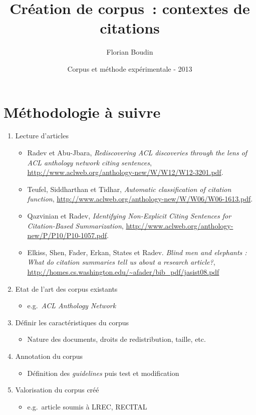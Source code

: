 \documentclass[12pt,a4paper]{article}
\begin{document}
\title{Création de corpus~: contextes de citations}
\author{Florian Boudin}
\date{Corpus et méthode expérimentale - 2013}

\maketitle

\section*{Méthodologie à suivre}

\begin{enumerate}
    \item Lecture d'articles
    \begin{itemize}
        \item Radev et Abu-Jbara, \textit{Rediscovering ACL discoveries through the lens of ACL anthology network citing sentences}, \url{http://www.aclweb.org/anthology-new/W/W12/W12-3201.pdf}.
        \item Teufel, Siddharthan et Tidhar, \textit{Automatic classification of citation function}, \url{http://www.aclweb.org/anthology-new/W/W06/W06-1613.pdf}.
        \item Qazvinian et Radev, \textit{Identifying Non-Explicit Citing Sentences for Citation-Based Summarization}, \url{http://www.aclweb.org/anthology-new/P/P10/P10-1057.pdf}.
        \item Elkiss, Shen, Fader, Erkan, States et Radev. \textit{Blind men and elephants : What do citation summaries tell us about a research article?}, \url{http://homes.cs.washington.edu/~afader/bib_pdf/jasist08.pdf}
    \end{itemize}                                                                                                                                 
    \item Etat de l'art des corpus existants
    \begin{itemize}
        \item e.g.~\textit{ACL Anthology Network}
    \end{itemize}
    \item Définir les caractéristiques du corpus
    \begin{itemize}
        \item Nature des documents, droits de redistribution, taille, etc.
    \end{itemize}
    \item Annotation du corpus
    \begin{itemize}
        \item Définition des \textit{guidelines} puis test et modification
    \end{itemize}
    \item Valorisation du corpus créé
    \begin{itemize}
        \item e.g.~article soumis à LREC, RECITAL
    \end{itemize}

\end{enumerate}
\end{document}
